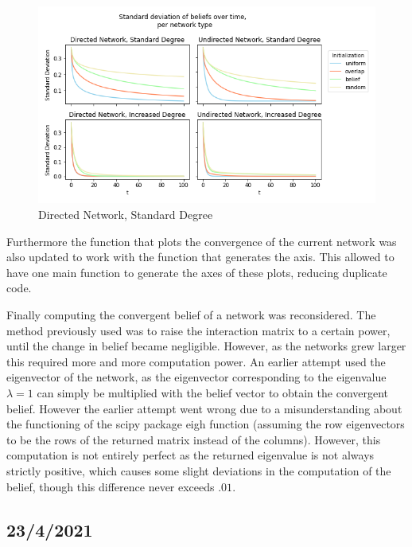 \documentclass{article}
\begin{document}
\begin{center}
    \begin{figure}[!htbp]
        \centering
        \includegraphics[width=1\textwidth]{ThesisKI/Images/ConvergenceComparison.png}
        \caption{Directed Network, Standard Degree}
        \label{convergence:networks}
    \end{figure}
\end{center}

Furthermore the function that plots the convergence of the current network was also updated to work with the function that generates the axis. This allowed to have one main function to generate the axes of these plots, reducing duplicate code.

Finally computing the convergent belief of a network was reconsidered. The method previously used was to raise the interaction matrix to a certain power, until the change in belief became negligible. However, as the networks grew larger this required more and more computation power. An earlier attempt used the eigenvector of the network, as the eigenvector corresponding to the eigenvalue $\lambda=1$ can simply be multiplied with the belief vector to obtain the convergent belief. However the earlier attempt went wrong due to a misunderstanding about the functioning of the scipy package eigh function (assuming the row eigenvectors to be the rows of the returned matrix instead of the columns). However, this computation is not entirely perfect as the returned eigenvalue is not always strictly positive, which causes some slight deviations in the computation of the belief, though this difference never exceeds $.01$.

\subsection{23/4/2021}
\end{document}
